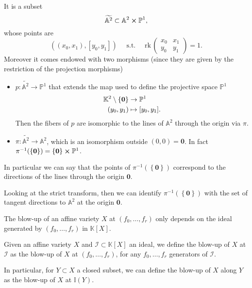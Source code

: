 \begin{ex}
	It is a subset
	\begin{equation}
	\widetilde{\mathbb{A}^{2}} \subset \mathbb{A}^{2} \cross \mathbb{P}^{1}
	,\end{equation} 
	whose points are 
	\begin{equation}
	\left( (x_0, x_1), [y_0,y_1] \right)\quad \text{ s.t. }\quad \mathrm{rk}\, 
	\begin{pmatrix}
		x_0 & x_1\\y_0 & y_1
	\end{pmatrix} = 1
	.\end{equation} 
	Moreover it comes endowed with two morphisms (since they are given by the
	restriction of the projection morphisms)
	\begin{itemize}
		\item $p: \widetilde{\mathbb{A}^{2}} \to \mathbb{P}^{1}$ that extends the map
			used to define the projective space $\mathbb{P}^{1}$
			\begin{align}
				\mathbb{K}^2\setminus\left\{ \textbf{0} \right\} &\to \mathbb{P}^{1} \\
				(y_0,y_1) &\mapsto [y_0,y_1]
			.\end{align} 
			Then the fibers of $p$ are isomorphic to the lines of $\mathbb{A}^{2}$
			through the origin via $\pi$.
		\item $\pi: \widetilde{\mathbb{A}^{2}} \to \mathbb{A}^{2}$, which is an isomorphism
			outside $(0,0) = \mathbf{0}$.
			In fact $\pi^{-1}(\left\{ \mathbf{0} \right\}) = \left\{ \mathbf{0} \right\} \cross \mathbb{P}^{1}$.
	\end{itemize}
	In particular we can say that the points of $\pi^{-1}\left( \left\{ \mathbf{0} \right\} \right)$ correspond
	to the directions of the lines through the origin $\mathbf{0}$.

	Looking at the strict transform, then we can identify $\pi^{-1}(\left\{ \mathbf{0} \right\})$
	with the set of tangent directions to $\mathbb{A}^{2}$ at the origin $\mathbf{0}$.
\end{ex} 

\begin{lem}
	The blow-up of an affine variety $X$ at $(f_0, \ldots, f_r)$
	only depends on the ideal generated by $(f_0, \ldots, f_r)$ in $\mathbb{K}[X]$.
\end{lem} 

\begin{defn}
	Given an affine variety $X$ and $\mathcal{I} \subset \mathbb{K}[X]$ an ideal,
	we define the blow-up of $X$ at $\mathcal{I}$ as the
	blow-up of $X$ at $(f_0, \ldots, f_r)$, for any $f_0, \ldots, f_r$ generators 
	of $\mathcal{I}$.

	In particular, for $Y \subset X$ a closed subset, we can define the blow-up of $X$
	along $Y$ as the blow-up of $X$ at $\mathbb{I}(Y)$.
\end{defn}

